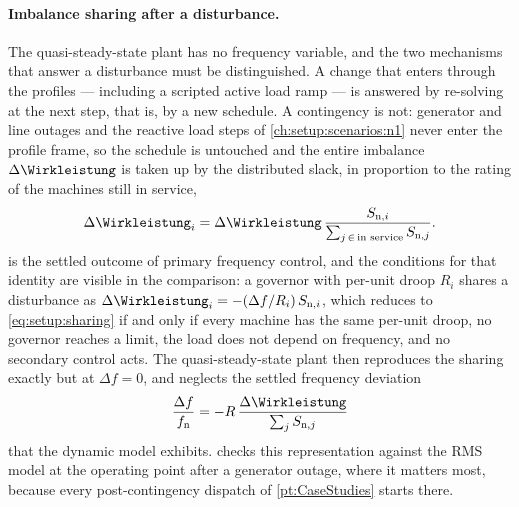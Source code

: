 \paragraph{Imbalance sharing after a disturbance.}
The quasi-steady-state plant has no frequency variable, and the two mechanisms that answer a disturbance must be distinguished.
A change that enters through the profiles --- including a scripted active load ramp --- is answered by re-solving  at the next step, that is, by a new schedule.
A contingency is not: generator and line outages and the reactive load steps of \cref{ch:setup:scenarios:n1} never enter the profile frame, so the schedule is untouched and the entire imbalance $\Delta\Wirkleistung$ is taken up by the distributed slack, in proportion to the rating of the machines still in service,
\begin{equation}
	\Delta\Wirkleistung_{i} = \Delta\Wirkleistung \,\frac{S_{\mathrm{n},i}}{\sum_{j \,\in\, \text{in service}} S_{\mathrm{n},j}}.
	\label{eq:setup:sharing}
\end{equation}
 is the settled outcome of primary frequency control, and the conditions for that identity are visible in the comparison: a governor with per-unit droop $R_{i}$ shares a disturbance as $\Delta\Wirkleistung_{i} = -(\Delta f / R_{i})\,S_{\mathrm{n},i}$, which reduces to \cref{eq:setup:sharing} if and only if every machine has the same per-unit droop, no governor reaches a limit, the load does not depend on frequency, and no secondary control acts.
The quasi-steady-state plant then reproduces the sharing exactly but at $\Delta f = 0$, and neglects the settled frequency deviation
\begin{equation}
	\frac{\Delta f}{f_{\mathrm{n}}} = -R\,\frac{\Delta\Wirkleistung}{\sum_{j} S_{\mathrm{n},j}}
	\label{eq:setup:df}
\end{equation}
that the dynamic model exhibits.
 checks this representation against the \gls{RMS} model at the operating point after a generator outage, where it matters most, because every post-contingency dispatch of \cref{pt:CaseStudies} starts there.

